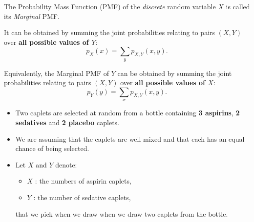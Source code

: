 \documentclass[notes=show,handout]{beamer}\usepackage[]{graphicx}\usepackage[]{color}
\begin{document}
\begin{frame}{\secname}

  \begin{definition}
  The Probability Mass Function (PMF) of the \emph{discrete} random variable
  $X$ is called its \emph{Marginal} PMF.

  It can be obtained by summing the joint probabilities relating to pairs $
  (X,Y)$ over \textbf{all possible values of $Y$}:
  \begin{equation*}
  p_{X}(x)=\sum_{y}p_{X,Y}(x,y).
  \end{equation*}
  \end{definition}

  Equivalently, the Marginal PMF of $Y$ can be obtained by summing the joint probabilities relating to pairs $(X,Y)$ over \textbf{all possible values of $X$}:
  \begin{equation*}
  p_{Y}(y)=\sum_{x}p_{X,Y}(x,y).
  \end{equation*}

\end{frame}


\begin{frame}{\secname}


  \begin{example}[Caplets]
  \begin{footnotesize}

  \begin{itemize}
  \item Two caplets are selected at random from a bottle containing \textbf{3
  aspirins}, \textbf{2 sedatives} and \textbf{2 placebo} caplets.

  \item We are assuming that the caplets are well mixed and that each has an
  equal chance of being selected.

  \item Let $X$ and $Y$ denote:
  \begin{itemize}
  \item $X$ : the numbers of aspirin caplets,
  \item $Y$ : the number of sedative caplets,
  \end{itemize}
  that we pick when we draw when we draw two caplets from the bottle.
  \end{itemize}
  \end{footnotesize}
  \end{example}
\end{frame}
\end{document}
